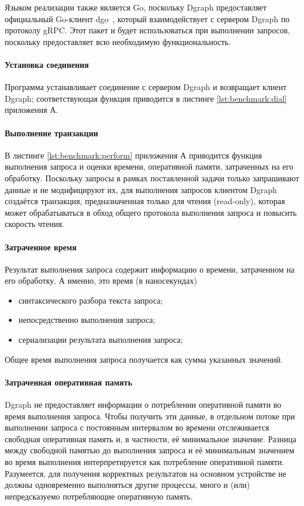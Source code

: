 Языком реализации также является Go, поскольку Dgraph предоставляет официальный Go-клиент dgo~\cite{dgo}, который
взаимодействует с сервером Dgraph по протоколу gRPC. Этот пакет и будет использоваться при выполнении запросов,
поскольку предоставляет всю необходимую функциональность.

\paragraph{Установка соединения}

Программа устанавливает соединение с сервером Dgraph и возвращает клиент Dgraph; соответствующая функция приводится в
листинге \ref{lst:benchmark:dial} приложения А.

\paragraph{Выполнение транзакции}

В листинге \ref{lst:benchmark:perform} приложения А приводится функция выполнения запроса и оценки времени, оперативной
памяти, затраченных на его обработку. Поскольку запросы в рамках поставленной задачи только запрашивают данные и не
модифицируют их, для выполнения запросов клиентом Dgraph создаётся транзакция, предназначенная только для чтения
(read-only), которая может обрабатываться в обход общего протокола выполнения запроса и повысить скорость чтения.

\paragraph{Затраченное время}

Результат выполнения запроса содержит информацию о времени, затраченном на его обработку. А именно, это время (в
наносекундах)
\begin{itemize}
  \item синтаксического разбора текста запроса;
  \item непосредственно выполнения запроса;
  \item сериализации результата выполнения запроса;
\end{itemize}
Общее время выполнения запроса получается как сумма указанных значений.

\paragraph{Затраченная оперативная память}

Dgraph не предоставляет информации о потреблении оперативной памяти во время выполнения запроса. Чтобы получить эти
данные, в отдельном потоке при выполнении запроса с постоянным интервалом во времени отслеживается свободная оперативная
память и, в частности, её минимальное значение. Разница между свободной памятью до выполнения запроса и её минимальным
значением во время выполнения интерпретируется как потребление оперативной памяти. Разумеется, для получения корректных
результатов на основном устройстве не должны одновременно выполняться другие процессы, много и (или) непредсказуемо
потребляющие оперативную память.

